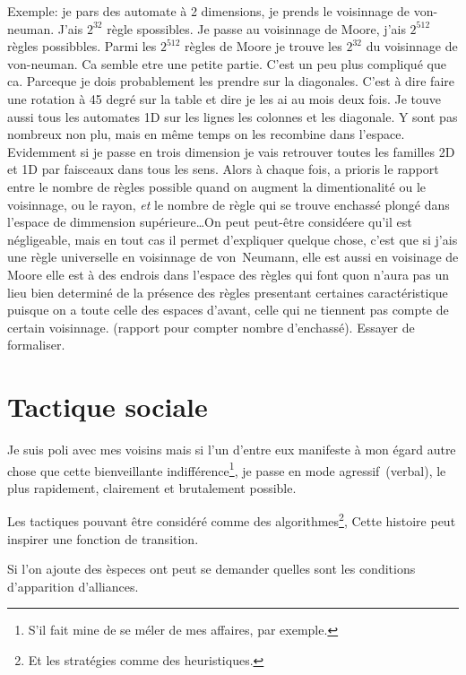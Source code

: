 Exemple: je pars des automate \`a 2 dimensions,
je prends le voisinnage de von-neuman. %
J'ais $2^{32}$ r\`egle spossibles. %
Je passe au voisinnage de Moore,
j'ais $2^{512}$ r\`egles possibbles. %
Parmi les $2^{512}$ r\`egles de Moore je trouve les $2^{32}$ du voisinnage
de von-neuman. %
Ca semble etre une petite partie. %
C'est un peu plus compliqu\'e que ca. %
Parceque je dois probablement les prendre sur la diagonales. %
C'est \`a dire faire une rotation \`a 45 degr\'e sur la table
et dire je les ai au mois deux fois. %
Je touve aussi tous les automates 1D sur les lignes les colonnes et les diagonale. %
Y sont pas nombreux non plu, mais en m\^eme temps on les recombine dans l'espace. %
Evidemment si je passe en trois dimension je vais retrouver toutes les
familles 2D et 1D par faisceaux dans tous les sens. %
Alors \`a chaque fois, a prioris le rapport entre le nombre de r\`egles
possible quand on augment la dimentionalit\'e ou le voisinnage, ou le
rayon, \emph{et} le nombre de r\`egle qui se trouve enchass\'e plong\'e dans
l'espace de dimmension sup\'erieure\ldots On peut peut-\^etre consid\'eere
qu'il est n\'egligeable, mais en tout cas il permet d'expliquer quelque
chose, c'est que si j'ais une r\`egle universelle en voisinnage de
von~Neumann, elle est aussi en voisinage de Moore elle est \`a des
endrois dans l'espace des r\`egles qui font quon n'aura pas un lieu bien
determin\'e de la pr\'esence des r\`egles presentant certaines
caract\'eristique puisque on a toute celle des espaces d'avant,
celle qui ne tiennent pas compte de certain voisinnage. %
(rapport  pour compter nombre d'enchass\'e).
Essayer de formaliser.

\section{Tactique sociale}

Je suis poli avec mes voisins mais si l'un d'entre eux manifeste \`a mon
\'egard autre chose que cette bienveillante indiff\'erence\footnote{%
  S'il fait mine de se m\'eler de mes affaires, par exemple.}, %
je passe en mode agressif~(verbal), le plus rapidement, clairement et
brutalement possible.

Les tactiques pouvant \^etre consid\'er\'e comme des algorithmes\footnote{%
  Et les strat\'egies comme des heuristiques.}, %
Cette histoire peut inspirer une fonction de transition.

Si l'on ajoute des \`especes ont peut se demander quelles sont les
conditions d'apparition d'alliances.


